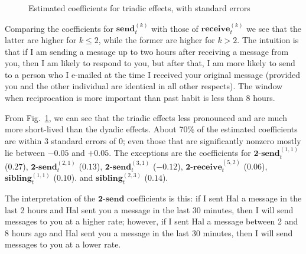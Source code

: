 \documentclass[final]{statsoc}
\begin{document}
\begin{figure}
  \centering
  \caption{Estimated coefficients for triadic effects, with standard errors}
  \label{F:enron-triad}
\end{figure}


Comparing the coefficients for $\textbf{send}_t^{(k)}$ with those of
$\textbf{receive}_t^{(k)}$ we see that the latter are higher for $k \leq 2$,
while the former are higher for $k > 2$.  The intuition is that if I am
sending a message up to two hours after receiving a message from you, then I
am likely to respond to you, but after that, I am more likely to send to a
person who I e-mailed at the time I received your original message (provided
you and the other individual are identical in all other respects).  The window
when reciprocation is more important than past habit is less than 8 hours.

From Fig.~\ref{F:enron-triad}, we can see that the triadic effects less
pronounced and are much more short-lived than the dyadic effects.  About
70\% of the estimated coefficients are within $3$ standard errors of
$0$; even those that are significantly nonzero mostly lie between $-0.05$ and
$+0.05$.  The exceptions are the coefficients for
$\textbf{2-send}_t^{(1,1)}$ ($0.27$),
$\textbf{2-send}_t^{(2,1)}$ ($0.13$),
$\textbf{2-send}_t^{(3,1)}$ ($-0.12$),
$\textbf{2-receive}_t^{(5,2)}$ ($0.06$),
$\textbf{sibling}_t^{(1,1)}$ ($0.10$).
and
$\textbf{sibling}_t^{(2,3)}$ ($0.14$).

The interpretation of the
$\textbf{2-send}$ coefficients is this: if I sent Hal a message in the last 2
hours and Hal sent you a message in the last 30 minutes, then I will send
messages to you at a higher rate; however, if I sent Hal a message between 2
and 8 hours ago and Hal sent you a message in the last 30 minutes, then I will
send messages to you at a lower rate.
\end{document}
